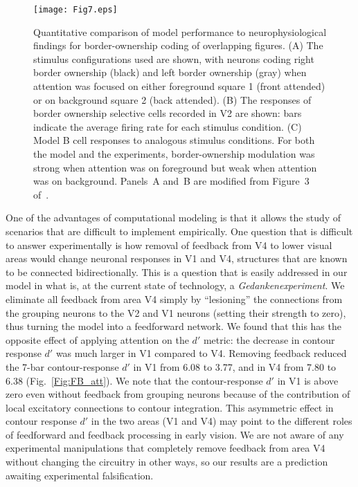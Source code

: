 {\begin{figure*}
\begin{center}
\texttt{[image: Fig7.eps]}
\end{center}
\caption{Quantitative comparison of model performance to
  neurophysiological findings \citep{Qiu_etal07} for border-ownership coding of
  overlapping figures. (A) The stimulus configurations used are shown,
  with neurons coding right border ownership (black) and left border
  ownership (gray) when attention was focused on either foreground
  square 1 (front attended) or on background square 2 (back
  attended). (B) The responses of border ownership selective cells
  recorded in V2 are shown:  bars indicate the
  average firing rate 
  for each stimulus condition. (C) Model B cell responses to analogous
  stimulus conditions. For both the model and the experiments,
  border-ownership modulation was strong when attention was on
  foreground but weak when attention was on background. %
Panels~A and~B are modified from Figure~3 of~\cite{Qiu_etal07}.} 
\label{Fig:Overlap_Square_exp_model}
\end{figure*}

One of the advantages of computational modeling is that it allows the
study of scenarios that are difficult to implement empirically.
One question that is difficult to answer experimentally is how removal of
feedback 
from V4 to lower visual areas
%
would change neuronal responses in V1 and V4, structures that
are known to be connected bidirectionally. This is a question that is
easily addressed in our model in what is, at the current state of
technology, a {\em Gedankenexperiment}. We eliminate all feedback from area
V4  simply by ``lesioning'' the 
connections from the grouping neurons to the V2 and V1 neurons
(setting their strength to zero), thus turning the model into a
feedforward network.  We found that this has the opposite effect of
applying attention on the $d'$ metric: the decrease in contour
response $d'$ was much larger in V1 compared to V4. Removing feedback
reduced the 7-bar contour-response $d'$ in V1 from 6.08 to 3.77, and
in V4 from 7.80 to 6.38 (Fig.~\ref{Fig:FB_att}). We note that the
contour-response $d'$ in V1 is above zero even without feedback from
grouping neurons because of the contribution of local
excitatory connections to contour integration.
This asymmetric
effect in contour response $d'$ in the two areas (V1 and V4) may point
to the different roles of feedforward and feedback processing in early
vision. We are not aware of any experimental manipulations that completely
remove feedback from area V4 without changing the circuitry in other
ways, so our results are a prediction awaiting experimental
falsification.

}
